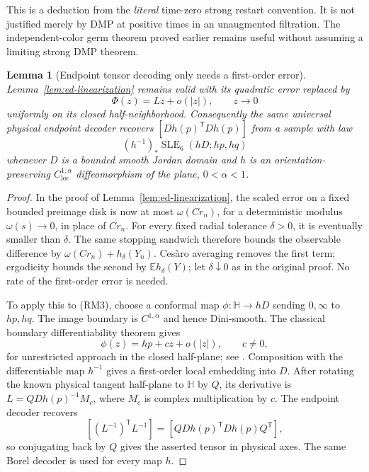 \documentclass[11pt]{article}
\newtheorem{lemma}[theorem]{Lemma}
\theoremstyle{definition}\newtheorem{definition}[theorem]{Definition}
\theoremstyle{remark}\newtheorem{remark}[theorem]{Remark}
\begin{document}
This is a deduction from the \emph{literal} time-zero strong restart
convention. It is not justified merely by DMP at positive times in an
unaugmented filtration. The independent-color germ theorem proved
earlier remains useful without assuming a limiting strong DMP theorem.

\begin{lemma}[Endpoint tensor decoding only needs a first-order error]
\label{lem:endpoint-decoder-first-order}
Lemma~\ref{lem:ed-linearization} remains valid with its quadratic error
replaced by
\[
 \Phi(z)=Lz+o(|z|),\qquad z\to0
 \tag{RM2}
\]
uniformly on its closed half-neighborhood. Consequently the same
universal physical endpoint decoder recovers
$[Dh(p)^{\mathsf T}Dh(p)]$ from a sample with law
\[
 (h^{-1})_*\operatorname{SLE}_6(hD;hp,hq)
 \tag{RM3}
\]
whenever $D$ is a bounded smooth Jordan domain and $h$ is an
orientation-preserving $C^{1,\alpha}_{\mathrm{loc}}$ diffeomorphism
of the plane, $0<\alpha<1$.
\end{lemma}
\begin{proof}
In the proof of Lemma~\ref{lem:ed-linearization}, the scaled error on a
fixed bounded preimage disk is now at most $\omega(Cr_n)$, for a
deterministic modulus $\omega(s)\to0$, in place of $Cr_n$. For every
fixed radial tolerance $\delta>0$, it is eventually smaller than
$\delta$. The same stopping sandwich therefore bounds the observable
difference by $\omega(Cr_n)+h_\delta(Y_n)$. Ces\`aro averaging removes
the first term; ergodicity bounds the second by
$\mathbb E h_\delta(Y)$; let $\delta\downarrow0$ as in the original
proof. No rate of the first-order error is needed.

To apply this to (RM3), choose a conformal map
$\phi:\mathbb H\to hD$ sending $0,\infty$ to $hp,hq$.
The image boundary is $C^{1,\alpha}$ and hence Dini-smooth. The
classical boundary differentiability theorem gives
\[
 \phi(z)=hp+c z+o(|z|),\qquad c\ne0,
\]
for unrestricted approach in the closed half-plane; see
\cite[Theorem 1]{warschawski-boundary-1961}. Composition with the
differentiable map $h^{-1}$ gives a first-order local embedding into $D$.
After rotating the known physical tangent half-plane to $\mathbb H$ by
$Q$, its derivative is
$L=QDh(p)^{-1}M_c$, where $M_c$ is complex multiplication by $c$.
The endpoint decoder recovers
\[
 [(L^{-1})^{\mathsf T}L^{-1}]
       =[QDh(p)^{\mathsf T}Dh(p)Q^{\mathsf T}],
\]
so conjugating back by $Q$ gives the asserted tensor in physical axes.
The same Borel decoder is used for every map $h$.
\end{proof}
\end{document}
